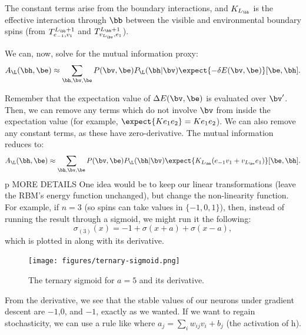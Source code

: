 The constant terms arise from the boundary interactions, and
$K_{L_\bb}$ is the effective interaction through $\bb$ between the
visible and environmental boundary spins (from
$T_{e_{-1},v_1}^{L_\bb+1}$ and $T_{v_{L_\bv},e_1}^{L_\bb+1}$).

We can, now, solve for the mutual information proxy:
\begin{equation}%
  A_{\L}(\bh,\be)\approx \sum_{\bh,\bv,\be}P(\bv,\be)P_\L(\bh\rvert\bv)\expect{-\delta E(\bv,\be)}[\be, \bh].
\end{equation}%

Remember that the expectation value of $\Delta E(\bv,\be)$ is
evaluated over $\bv'$. Then, we can remove any terms which do not
involve $\bv$ from inside the expectation value (for example,
$\expect{Ke_1e_2}=Ke_1e_2$). We can also remove any constant terms, as
these have zero-derivative.  The mutual information reduces to:%
\begin{equation}%
  A_{\L}(\bh,\be)\approx \sum_{\bh,\bv,\be}P(\bv,\be)P_\L(\bh\rvert\bv)\expect{K_{L_\bb}(e_{-1}v_1+v_{L_\bv}e_1)}[\be, \bh].
\end{equation}%
p
MORE DETAILS
One idea would be to keep our linear transformations (leave the RBM's
energy function unchanged), but change the non-linearity function. For
example, if $n=3$ (so spins can take values in $\{-1,0,1\}$), then,
instead of running the result through a sigmoid, we might run it the
following:%
\begin{equation}%
  \sigma_{(3)}(x)=-1+ \sigma(x+a)+\sigma(x-a),
\end{equation}%
which is plotted in  along with its
derivative.

\begin{figure}[ht]
  \centering \texttt{[image: figures/ternary-sigmoid.png]}
  \caption{The ternary sigmoid for $a=5$ and its
    derivative\label{fig:ternary-sigmoid.png}.}
\end{figure}

From the derivative, we see that the stable values of our neurons
under gradient descent are $-1$,$0$, and $-1$, exactly as we
wanted. If we want to regain stochasticity, we can use a rule like%
where $a_j=\sum_i w_{ij} v_i+b_j$ (the activation of h).

